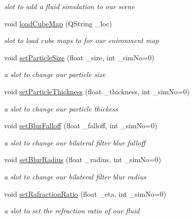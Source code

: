 \begin{DoxyCompactItemize}
\begin{DoxyCompactList}\small\item\em slot to add a fluid simulation to our scene \end{DoxyCompactList}\item 
void \hyperlink{class_open_g_l_widget_a39018f8fc74ce591bfac884c277621e6}{load\-Cube\-Map} (Q\-String \-\_\-loc)
\begin{DoxyCompactList}\small\item\em slot to load cube maps to for our enironment map \end{DoxyCompactList}\item 
void \hyperlink{class_open_g_l_widget_a3cdaf60ea4f98ee4782dec21b4810a41}{set\-Particle\-Size} (float \-\_\-size, int \-\_\-sim\-No=0)
\begin{DoxyCompactList}\small\item\em a slot to change our particle size \end{DoxyCompactList}\item 
void \hyperlink{class_open_g_l_widget_aec967838bdff11519892bc05a5d930b0}{set\-Particle\-Thickness} (float \-\_\-thickness, int \-\_\-sim\-No=0)
\begin{DoxyCompactList}\small\item\em a slot to change our particle thickess \end{DoxyCompactList}\item 
void \hyperlink{class_open_g_l_widget_a8e96b44ed40ec8a5fe726f427f01e6fe}{set\-Blur\-Falloff} (float \-\_\-falloff, int \-\_\-sim\-No=0)
\begin{DoxyCompactList}\small\item\em a slot to change our bilateral filter blur falloff \end{DoxyCompactList}\item 
void \hyperlink{class_open_g_l_widget_add467ba5217218564d08ffb638b2f190}{set\-Blur\-Radius} (float \-\_\-radius, int \-\_\-sim\-No=0)
\begin{DoxyCompactList}\small\item\em a slot to change our bilateral filter blur radius \end{DoxyCompactList}\item 
void \hyperlink{class_open_g_l_widget_a9ad49f35e3a76ec5ea58cedbe73afa34}{set\-Rafraction\-Ratio} (float \-\_\-eta, int \-\_\-sim\-No=0)
\begin{DoxyCompactList}\small\item\em a slot to set the refraction ratio of our fluid \end{DoxyCompactList}\item 

\end{DoxyCompactItemize}
